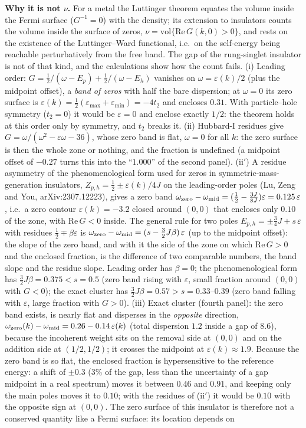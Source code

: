 \documentclass[11pt]{article}
\begin{document}
\textbf{Why it is not $\nu$.} For a metal the Luttinger theorem equates the volume inside the Fermi surface ($G^{-1}=0$) with the density; its extension to insulators counts the volume inside the surface of zeros, $\nu=\mathrm{vol}\{\mathrm{Re}\,G(k,0)>0\}$, and rests on the existence of the Luttinger--Ward functional, i.e.\ on the self-energy being reachable perturbatively from the free band. The gap of the rung-singlet insulator is not of that kind, and the calculations show how the count fails. (i) Leading order: $G=\tfrac12/(\omega-E_p)+\tfrac12/(\omega-E_h)$ vanishes on $\omega=\varepsilon(k)/2$ (plus the midpoint offset), a \emph{band of zeros} with half the bare dispersion; at $\omega=0$ its zero surface is $\varepsilon(k)=\tfrac12(\varepsilon_{\max}+\varepsilon_{\min})=-4t_2$ and encloses $0.31$. With particle--hole symmetry ($t_2=0$) it would be $\varepsilon=0$ and enclose exactly $1/2$: the theorem holds at this order only by symmetry, and $t_2$ breaks it. (ii) Hubbard-I residues give $G=\omega/(\omega^2-\varepsilon\omega-36)$, whose zero band is flat, $\omega=0$ for all $k$: the zero surface is then the whole zone or nothing, and the fraction is undefined (a midpoint offset of $-0.27$ turns this into the ``$1.000$'' of the second panel). (ii$'$) A residue asymmetry of the phenomenological form used for zeros in symmetric-mass-generation insulators, $Z_{p,h}=\tfrac12\pm\varepsilon(k)/4J$ on the leading-order poles (Lu, Zeng and You, arXiv:2307.12223), gives a zero band $\omega_{\rm zero}-\omega_{\rm mid}=(\tfrac12-\tfrac{3J}{8J})\varepsilon=0.125\,\varepsilon$, i.e.\ a zero contour $\varepsilon(k)=-3.2$ closed around $(0,0)$ that encloses only $0.10$ of the zone, with $\mathrm{Re}\,G<0$ inside. The general rule for two poles $E_{p,h}=\pm\tfrac34J+s\,\varepsilon$ with residues $\tfrac12\mp\beta\varepsilon$ is $\omega_{\rm zero}-\omega_{\rm mid}=(s-\tfrac32J\beta)\,\varepsilon$ (up to the midpoint offset): the slope of the zero band, and with it the side of the zone on which $\mathrm{Re}\,G>0$ and the enclosed fraction, is the difference of two comparable numbers, the band slope and the residue slope. Leading order has $\beta=0$; the phenomenological form has $\tfrac32J\beta=0.375<s=0.5$ (zero band rising with $\varepsilon$, small fraction around $(0,0)$ with $G<0$); the exact cluster has $\tfrac32J\beta=0.57>s=0.33$--$0.39$ (zero band falling with $\varepsilon$, large fraction with $G>0$). (iii) Exact cluster (fourth panel): the zero band exists, is nearly flat and disperses in the \emph{opposite} direction, $\omega_{\rm zero}(k)-\omega_{\rm mid}=0.26-0.14\,\varepsilon(k)$ (total dispersion $1.2$ inside a gap of $8.6$), because the incoherent weight sits on the removal side at $(0,0)$ and on the addition side at $(1/2,1/2)$; it crosses the midpoint at $\varepsilon(k)\approx1.9$. Because the zero band is so flat, the enclosed fraction is hypersensitive to the reference energy: a shift of $\pm0.3$ ($3\%$ of the gap, less than the uncertainty of a gap midpoint in a real spectrum) moves it between $0.46$ and $0.91$, and keeping only the main poles moves it to $0.10$; with the residues of (ii$'$) it would be $0.10$ with the opposite sign at $(0,0)$. The zero surface of this insulator is therefore not a conserved quantity like a Fermi surface: its location depends on 
\end{document}
